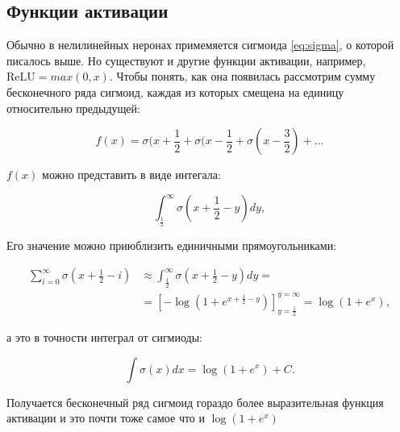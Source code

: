 \subsection{Функции активации}

Обычно в нелилинейных неронах примемяется сигмоида \ref{eq:sigma}, о которой писалось выше. Но существуют и другие функции активации, например, $\text{ReLU} = max(0, x)$. Чтобы понять, как она появилась рассмотрим сумму бесконечного ряда сигмоид, каждая из которых смещена на единицу относительно предыдущей:

\begin{equation*}
 f(x) = \sigma(x+\frac{1}{2} + \sigma(x-\frac{1}{2} + \sigma(x-\frac{3}{2}) + \ldots
\end{equation*}

$f(x)$ можно представить в виде интегала:

\begin{equation*}
 \int_\frac{1}{2}^\infty \sigma(x+\frac{1}{2}-y)dy,
\end{equation*}

Его значение можно приюблизить единичными прямоугольниками:

\begin{equation*}
\begin{aligned}
  \sum_{i=0}^\infty \sigma(x+\frac{1}{2}-i) & \approx \int_\frac{1}{2}^\infty \sigma(x+\frac{1}{2}-y)dy = \\
  & = \left[-\log (1+e^{x+\frac{1}{2}-y})\right]^{y=\infty}_{y=\frac{1}{2}} = \log (1+e^x),
\end{aligned}
\end{equation*}

а это в точности интеграл от сигмиоды:

\begin{equation*}
 \int \sigma (x) dx = \log(1+e^x) + C.
\end{equation*}

Получается бесконечный ряд сигмоид гораздо более выразительная функция активации и это почти тоже самое что и $\log(1+e^x)$



